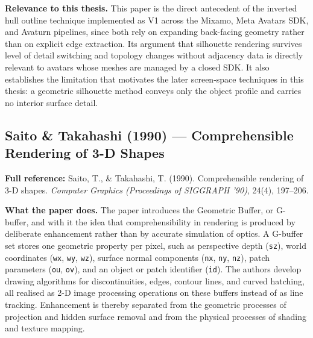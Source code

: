 \documentclass[11pt, a4paper]{article}
\begin{document}
\textbf{Relevance to this thesis.} This paper is the direct antecedent of the inverted hull outline technique implemented as V1 across the Mixamo, Meta Avatars SDK, and Avaturn pipelines, since both rely on expanding back-facing geometry rather than on explicit edge extraction. Its argument that silhouette rendering survives level of detail switching and topology changes without adjacency data is directly relevant to avatars whose meshes are managed by a closed SDK. It also establishes the limitation that motivates the later screen-space techniques in this thesis: a geometric silhouette method conveys only the object profile and carries no interior surface detail.

\vspace{8pt}

\subsection{Saito \& Takahashi (1990) --- Comprehensible Rendering of 3-D Shapes}

\begin{refbox}
\textbf{Full reference:} Saito, T., \& Takahashi, T. (1990). Comprehensible rendering of 3-D shapes. \textit{Computer Graphics (Proceedings of SIGGRAPH '90)}, 24(4), 197--206.
\end{refbox}

\textbf{What the paper does.} The paper introduces the Geometric Buffer, or G-buffer, and with it the idea that comprehensibility in rendering is produced by deliberate enhancement rather than by accurate simulation of optics. A G-buffer set stores one geometric property per pixel, such as perspective depth (\texttt{sz}), world coordinates (\texttt{wx}, \texttt{wy}, \texttt{wz}), surface normal components (\texttt{nx}, \texttt{ny}, \texttt{nz}), patch parameters (\texttt{ou}, \texttt{ov}), and an object or patch identifier (\texttt{id}). The authors develop drawing algorithms for discontinuities, edges, contour lines, and curved hatching, all realised as 2-D image processing operations on these buffers instead of as line tracking. Enhancement is thereby separated from the geometric processes of projection and hidden surface removal and from the physical processes of shading and texture mapping.
\end{document}
